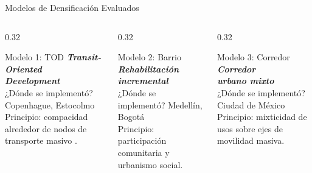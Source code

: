 \begin{frame}{Modelos de Densificación Evaluados}
  \begin{columns}[T]
    \begin{column}{0.32\textwidth}
      \begin{block}{Modelo 1: TOD}
        \textbf{\textit{Transit-Oriented\\Development}\\[0.2cm]}
        ¿Dónde se implementó? Copenhague, Estocolmo\\[0.1cm]
        {\small Principio: compacidad alrededor de nodos de transporte masivo \cite{ITDP_Espacio}.}
      \end{block}
    \end{column}
    \begin{column}{0.32\textwidth}
      \begin{block}{Modelo 2: Barrio}
        \textbf{\textit{Rehabilitación\\incremental}\\[0.2cm]}
        ¿Dónde se implementó? Medellín, Bogotá\\[0.1cm]
        {\small Principio: participación comunitaria y urbanismo social.}
      \end{block}
    \end{column}
    \begin{column}{0.32\textwidth}
      \begin{block}{Modelo 3: Corredor}
        \textbf{\textit{Corredor\\urbano mixto}\\[0.2cm]}
        ¿Dónde se implementó? Ciudad de México\\[0.1cm]
        {\small Principio: mixticidad de usos sobre ejes de movilidad masiva.}
      \end{block}
    \end{column}
  \end{columns}
\end{frame}

